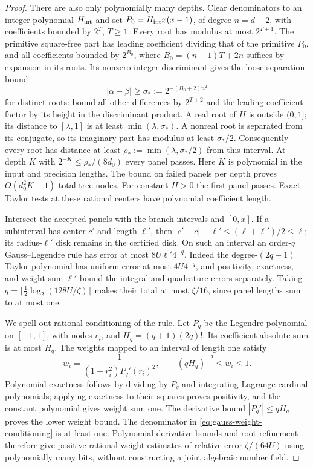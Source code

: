 \begin{proof}
There are also only polynomially many depths. Clear denominators to
an integer polynomial $H_{\rm int}$ and set
$P_0=H_{\rm int}x(x-1)$, of degree $n=d+2$, with coefficients
bounded by $2^T$, $T\ge1$. Every root has modulus at most $2^{T+1}$.
The primitive square-free part has leading coefficient dividing that
of the primitive $P_0$, and all coefficients bounded by $2^{B_0}$,
where $B_0=(n+1)T+2n$ suffices by expansion in its roots. Its nonzero
integer discriminant gives the loose separation bound
\[
 |\alpha-\beta|\ge\sigma_*:=2^{-(B_0+2)n^2}
\]
for distinct roots: bound all other differences by $2^{T+2}$ and the
leading-coefficient factor by its height in the discriminant product.
A real root of $H$ is outside $(0,1]$; its distance to $[\lambda,1]$
is at least $\min(\lambda,\sigma_*)$. A nonreal root is separated
from its conjugate, so its imaginary part has modulus at least
$\sigma_*/2$. Consequently every root has distance at least
$\rho_*:=\min(\lambda,\sigma_*/2)$ from this interval.
At depth $K$ with $2^{-K}\le\rho_*/(8d_0)$ every panel passes.
Here $K$ is polynomial in the input and precision lengths. The bound
on failed panels per depth proves $O(d_0^2K+1)$ total tree nodes.
For constant $H>0$ the first panel passes. Exact Taylor tests at these
rational centers have polynomial coefficient length.

Intersect the accepted panels with the branch intervals and $[0,x]$.
If a subinterval has center $c'$ and length $\ell'$, then
$|c'-c|+\ell'\le(\ell+\ell')/2\le\ell$; its radius-$\ell'$ disk
remains in the certified disk. On such an interval an order-$q$
Gauss--Legendre rule has error at most $8U\ell'4^{-q}$.
Indeed the degree-$(2q-1)$ Taylor polynomial has uniform error at
most $4U4^{-q}$, and positivity, exactness, and weight sum $\ell'$
bound the integral and quadrature errors separately. Taking
$q=\lceil\frac12\log_2(128U/\zeta)\rceil$ makes their total at
most $\zeta/16$, since panel lengths sum to at most one.

We spell out rational conditioning of the rule. Let $P_q$ be the
Legendre polynomial on $[-1,1]$, with nodes $r_i$, and
$H_q=(q+1)(2q)!$. Its coefficient absolute sum is at most $H_q$.
The weights mapped to an interval of length one satisfy
\begin{equation}\label{eq:gauss-weight-conditioning}
 w_i=\frac1{(1-r_i^2)P_q'(r_i)^2},\qquad
 (qH_q)^{-2}\le w_i\le1.
\end{equation}
Polynomial exactness follows by dividing by $P_q$ and integrating
Lagrange cardinal polynomials; applying exactness to their squares
proves positivity, and the constant polynomial gives weight sum one.
The derivative bound $|P_q'|\le qH_q$ proves the lower weight bound.
The denominator in \eqref{eq:gauss-weight-conditioning} is at least
one. Polynomial derivative bounds and root refinement therefore give
positive rational weight estimates of relative error
$\zeta/(64U)$ using polynomially many bits, without constructing a
joint algebraic number field.


\end{proof}
